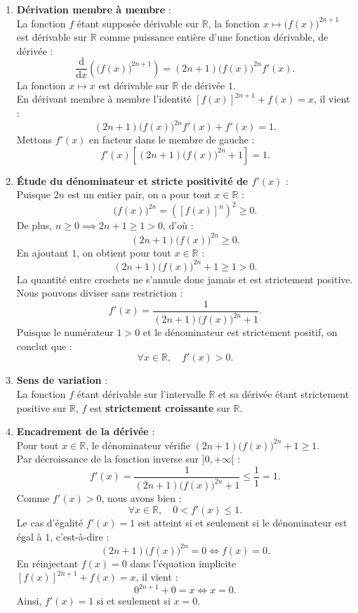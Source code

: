 \documentclass[11pt,a4paper]{article}
\newcommand{\R}{\mathbb{R}}
\newcommand{\dd}{\mathrm{d}}
\begin{document}
\begin{correctionbox}
\begin{enumerate}[label=\textbf{\arabic*.}]
    \item \textbf{Dérivation membre à membre} :\\
    La fonction $f$ étant supposée dérivable sur $\R$, la fonction $x \mapsto \big(f(x)\big)^{2n+1}$ est dérivable sur $\R$ comme puissance entière d'une fonction dérivable, de dérivée :
    \[
    \frac{\dd}{\dd x} \left( \big(f(x)\big)^{2n+1} \right) = (2n+1)\big(f(x)\big)^{2n} f'(x).
    \]
    La fonction $x \mapsto x$ est dérivable sur $\R$ de dérivée $1$.\\
    En dérivant membre à membre l'identité $[f(x)]^{2n+1} + f(x) = x$, il vient :
    \[
    (2n+1)\big(f(x)\big)^{2n} f'(x) + f'(x) = 1.
    \]
    Mettons $f'(x)$ en facteur dans le membre de gauche :
    \[
    f'(x) \left[ (2n+1)\big(f(x)\big)^{2n} + 1 \right] = 1.
    \]

    \item \textbf{Étude du dénominateur et stricte positivité de $f'(x)$} :\\
    Puisque $2n$ est un entier pair, on a pour tout $x \in \R$ :
    \[
    \big(f(x)\big)^{2n} = \left( [f(x)]^n \right)^2 \ge 0.
    \]
    De plus, $n \ge 0 \implies 2n+1 \ge 1 > 0$, d'où :
    \[
    (2n+1)\big(f(x)\big)^{2n} \ge 0.
    \]
    En ajoutant $1$, on obtient pour tout $x \in \R$ :
    \[
    (2n+1)\big(f(x)\big)^{2n} + 1 \ge 1 > 0.
    \]
    La quantité entre crochets ne s'annule donc jamais et est strictement positive. Nous pouvons diviser sans restriction :
    \[
    f'(x) = \frac{1}{(2n+1)\big(f(x)\big)^{2n} + 1}.
    \]
    Puisque le numérateur $1 > 0$ et le dénominateur est strictement positif, on conclut que :
    \[
    \forall x \in \R, \quad f'(x) > 0.
    \]

    \item \textbf{Sens de variation} :\\
    La fonction $f$ étant dérivable sur l'intervalle $\R$ et sa dérivée étant strictement positive sur $\R$, $f$ est \textbf{strictement croissante} sur $\R$.

    \item \textbf{Encadrement de la dérivée} :\\
    Pour tout $x \in \R$, le dénominateur vérifie $(2n+1)\big(f(x)\big)^{2n} + 1 \ge 1$.\\
    Par décroissance de la fonction inverse sur $]0, +\infty[$ :
    \[
    f'(x) = \frac{1}{(2n+1)\big(f(x)\big)^{2n} + 1} \le \frac{1}{1} = 1.
    \]
    Comme $f'(x) > 0$, nous avons bien :
    \[
    \forall x \in \R, \quad 0 < f'(x) \le 1.
    \]
    Le cas d'égalité $f'(x) = 1$ est atteint si et seulement si le dénominateur est égal à $1$, c'est-à-dire :
    \[
    (2n+1)\big(f(x)\big)^{2n} = 0 \iff f(x) = 0.
    \]
    En réinjectant $f(x) = 0$ dans l'équation implicite $[f(x)]^{2n+1} + f(x) = x$, il vient :
    \[
    0^{2n+1} + 0 = x \iff x = 0.
    \]
    Ainsi, $f'(x) = 1$ si et seulement si $x = 0$.
\end{enumerate}
\end{correctionbox}
\end{document}
